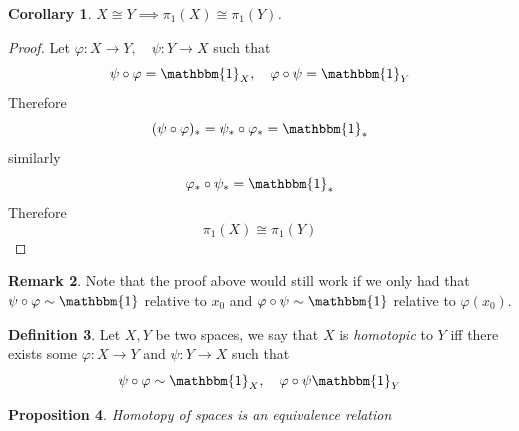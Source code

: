 \documentclass[11pt,a4paper]{article}
\theoremstyle{definition}
\newtheorem{definition}{Definition}[section]
\newtheorem{remark}[definition]{Remark}
\theoremstyle{plain}
\newtheorem{proposition}[definition]{Proposition}
\newtheorem{corollary}[definition]{Corollary}
\theoremstyle{remark}
\newcommand{\1}{\mathbbm{1}}
\begin{document}
\begin{corollary}
    $X \cong Y \implies \pi_1(X) \cong \pi_1 (Y)$. 
\end{corollary}

\begin{proof}
    Let $\varphi \colon X \to Y, \quad \psi \colon Y \to X$  such that 
    $$\psi \circ \varphi = \mathbbm{1}_{X}, \quad \varphi \circ \psi = \mathbbm{1}_Y$$
    Therefore 
    $$(\psi \circ \varphi)_* = \psi_* \circ \varphi_* = \mathbbm{1}_*$$
    similarly 
    $$\varphi_* \circ \psi_* = \mathbbm{1}_*$$
    Therefore 
    $$\pi_1(X) \cong \pi_1(Y)$$
\end{proof}

\begin{remark}
    Note that the proof above would still work if we only had that $\psi \circ \varphi \sim \mathbbm{1}$ relative to $x_0$ and 
    $\varphi \circ \psi \sim \mathbbm{1}$ relative to $\varphi(x_0)$.
\end{remark}

\begin{definition}
    Let $X, Y$ be two spaces, we say that $X$ is \emph{homotopic} to $Y$ iff there exists some 
    $\varphi \colon X \to Y$ and $\psi \colon Y \to X$ such that 
    $$\psi \circ \varphi \sim \mathbbm{1}_X, \quad \varphi \circ \psi \mathbbm{1}_Y$$
\end{definition}

\begin{proposition}
    Homotopy of spaces is an equivalence relation
\end{proposition}
\end{document}

